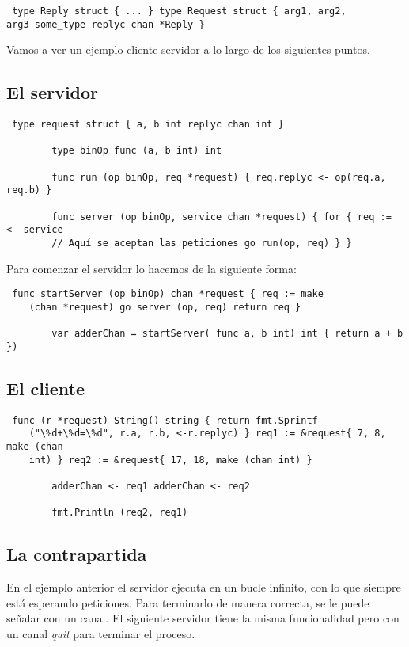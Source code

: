 \begin{verbatim} type Reply struct { ... } type Request struct { arg1, arg2,
arg3 some_type replyc chan *Reply } \end{verbatim}

Vamos a ver un ejemplo cliente-servidor a lo largo de los siguientes puntos.

	\subsection{El servidor}
	
	\begin{verbatim} type request struct { a, b int replyc chan int }
	   
		type binOp func (a, b int) int
	   
		func run (op binOp, req *request) { req.replyc <- op(req.a, req.b) }
	   
		func server (op binOp, service chan *request) { for { req := <- service
		// Aquí se aceptan las peticiones go run(op, req) } } \end{verbatim}
	
	Para comenzar el servidor lo hacemos de la siguiente forma:
	
	\begin{verbatim} func startServer (op binOp) chan *request { req := make
	(chan *request) go server (op, req) return req }
	   
		var adderChan = startServer( func a, b int) int { return a + b })
		\end{verbatim} \clearpage \subsection{El cliente}
	
	\begin{verbatim} func (r *request) String() string { return fmt.Sprintf
	("\%d+\%d=\%d", r.a, r.b, <-r.replyc) } req1 := &request{ 7, 8, make (chan
	int) } req2 := &request{ 17, 18, make (chan int) }
	   
		adderChan <- req1 adderChan <- req2
	   
		fmt.Println (req2, req1) \end{verbatim}
	
	\subsection{La contrapartida}
	
	En el ejemplo anterior el servidor ejecuta en un bucle infinito, con lo que
	siempre está esperando peticiones. Para terminarlo de manera correcta, se le
	puede señalar con un canal. El siguiente servidor tiene la misma
	funcionalidad pero con un canal \textit{quit} para terminar el proceso.
	
